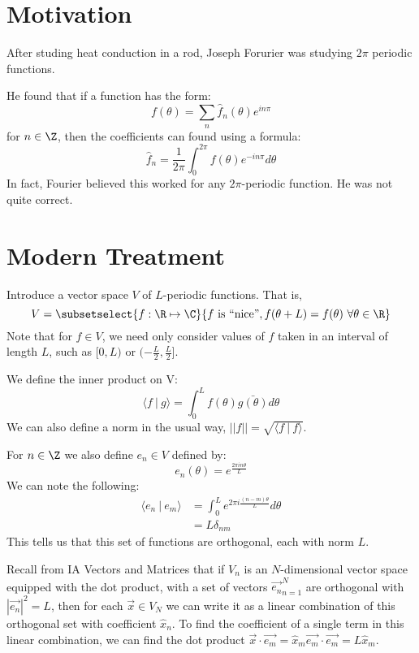 \documentclass[../Main.tex]{subfiles}
\begin{document}
\section{Motivation}
After studing heat conduction in a rod, Joseph Forurier was studying $2\pi$ periodic functions.

He found that if a function has the form:
\begin{equation*}
    f(\theta) = \sum_n \hat{f}_n(\theta) e^{in\pi}
\end{equation*}
for $n \in \Z$, then the coefficients can found using a formula:
\begin{equation*}
    \hat{f}_n = \frac{1}{2\pi} \int_0^{2\pi} f(\theta) e^{-in\pi} d\theta
\end{equation*}
In fact, Fourier believed this worked for any $2\pi$-periodic function. He was not quite correct.
\section{Modern Treatment}
Introduce a vector space $V$ of $L$-periodic functions. That is,
\begin{equation*}
    V = \subsetselect{f : \R \mapsto \C}{f\text{ is ``nice''}, f(\theta + L) = f(\theta)~\forall \theta \in \R}
\end{equation*}
Note that for $f \in V$, we need only consider values of $f$ taken in an interval of length $L$, such as $[0, L)$ or $(-\frac{L}{2}, \frac{L}{2}]$.

We define the inner product on V:
\begin{equation}
    \langle f~|~g\rangle = \int_0^L f(\theta) \bar{g(\theta)} d\theta
    \label{eqnInnerProdFuncs}
\end{equation}
We can also define a norm in the usual way, $||f|| = \sqrt{\langle f~|~f\rangle}$.

For $n \in \Z$ we also define $e_n \in V$ defined by:
\begin{equation}
    e_n(\theta) = e^\frac{2\pi in\theta}{L}
    \label{eqnFuncSpaceBasis}
\end{equation}
We can note the following:
\begin{align*}
    \langle e_n~|~e_m\rangle &= \int_0^L e^{2\pi i \frac{(n-m)\theta}{L}} d\theta \\
    &= L\delta_{nm}
\end{align*}
This tells us that this set of functions are orthogonal, each with norm $L$.

Recall from IA Vectors and Matrices that if $V_n$ is an $N$-dimensional vector space equipped with the dot product, with a set of vectors ${\vec{e_n}}_{n = 1}^N$ are orthogonal with $|\vec{e_n}|^2 = L$, then for each $\vec{x} \in V_N$ we can write it as a linear combination of this orthogonal set with coefficient $\hat{x}_n$. To find the coefficient of a single term in this linear combination, we can find the dot product $\vec{x} \cdot \vec{e_m} = \hat{x}_m \vec{e_m} \cdot \vec{e_m} = L\hat{x}_m$.
\end{document}
